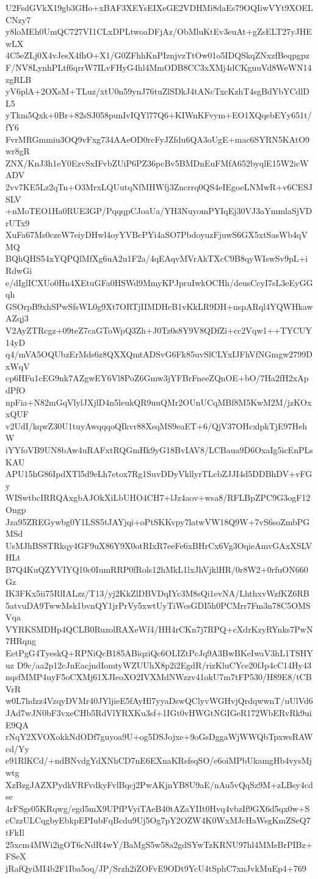 U2FsdGVkX19gb3GHo+xBAF3XEYsEIXeGE2VDHMi8daEs79OQIiwVYt9XOELCNzy7
y8loMEh0UmQC727VI1CLxDPLtwoaDFjAz/ObMluKtEv3euAt+gZsELT27yJHEwLX
4C5eZLj0X4vJesX4fhO+X1/G0ZFhhKnPIznjvzTtOw01o5IDQSkqZNxzfBeqpgpz
F/NV8LynhPLtf6qrrW7ILvFHyG4hl4MmODB8CC3xXMj4dCKguuVd8WeWN14zgRLB
yV6plA+2OXsM+TLuz/xtU0n59ynJ76tuZlSDkJ4tANcTxcKzhT4sgBdYbYCdlDL5
yTkm5Qxk+0Br+82sSJ058punIvIQYl77Q6+KIWnKFvym+EO1XQqebEYy651t/fY6
FvrMRGmmiu3OQ9vFxg734AAeOD0rcFyJZfdu6QA3oUgE+mac6SYRN5KAtO9wr8gR
ZNX/KnJ3h1eY0EzvSxIFvbZUiP6PZ36pcBv5BMDnEuFMfA652byqlE15W2icWADV
2vv7KE5Lz2qTn+O3MrxLQUutqNfMHWfj3Zncrrq0QS4eIEgoeLNMwR+v6CESJSLV
+nMoTEO1Ha0RUE3GP/PqqqpCJoaUa/YH3NuyomPYIqEj30VJ3aYmmlaSjVDrUTx9
XuFa67Ms0czeW7eiyDHwl4oyYVBcPYi4aSO7PbdoyuzFjuwS6GX5xtSasWb4qVMQ
BQhQHS54xYQPQlMfXg6uA2u1F2a/4qEAqvMVrAkTXcC9B8qyWIswSv9pL+iRdwGi
e/dIglICXUo0Hn4XEtuGFa0HSWd9MmyKPJpruIwkOCHh/deusCcyI7sL3eEyGGqh
GSOrpB9xhSPwSfsWL0g9Xt7ORTjIIMDHcB1vKkLR9DH+nspARql4YQWHkawAZqj3
V2AyZTRcgz+09teZ7caGToWpQ3Zh+J0Tz0s8Y9V8QDfZi+cc2Vqw1++TYCUY14yD
q4/mVA5OQUbzErMds6z8QXXQmtADSvG6Fk85uvSlCLYxIJFhVfNGmgw2799DxWqV
cp6HFu1cEG9nk7AZgwEY6Vl8PoZ6Gmw3jYFBrFneeZQnOE+bO/7Ha2fH2xApdPfO
npFia+N82mGqVlylJXjlD4n5leukQR9uuQMr2OUnUCqMBf8M5KwM2M/jzKOxxQUF
v2UdI/kqwZ30U1tuyAwqqqoQIkvr88XsqMS9eaET+6/QjV37OHcxlpkTjE97HehW
iYYfoVB9UN8bAw4uRAFxtRQGmHk9yG18BvIAV8/LCBaua9D6OxaIg5icEnPLsKAU
APU15hG86IpdXTl5d9eLh7etox7Rg1SuvDDyVkllyrTLcbZJJI4d5DDBhDV+vFGy
WISwtbcIRRQAxgbAJOkXiLbUHO4CH7+lJz4aov+wsa8/RFLBpZPC9G3ogF12Ongp
Jza95ZREGywbg0Y1LSS5tJAYjqi+oPtSKKvpy7latwVW18Q9W+7vS6soZmbPGMSd
UsMJhBS8TRkqy4GF9uX86Y9X0otRIxR7eeFe6xBHrCx6Vg3OqieAmvGAxXSLVHLt
B7Q4KuQZYVIYQ10c0IumRRP0fRols12hMkL1lxJhVjklHR/0r8W2+0rfuON660Gz
IK3FKx5ii75RlIALzz/T13/yj2KkZlDBVDqIYc3M8sQi1evNA/LhthxvWzfKZ6RB
5atvuDA9TwwMsk1bvnQY1jrPrVy5xwtUyTiWcsGDI5h0PCMrr7Fm3n78C5OMSVqa
VYRKSMDHp4QCLB0RuzolRAXeWf4/HH4rCKn7j7RPQ+cXdrKzyRYnks7PwN7HRqng
EetPgG4TyeskQ+RPNiQcB185ABiqziQc6OLIZtPcJq9A3BwBKeIwaV3hL1TSHYuz
D9c/aa2p12cJnEacjndIomtyWZUUhX8p2i2EgdR/rizKluCYce20fJp4cC14Hy43
nqsfMMP4uyF5oCXMj61XJIeoXO2IVXMdNWzzv41okU7m7tFP530/H89E8/tCBVrR
w0L7hdzz4VzqyDVMr40JYljieE5fAyHl7yyaDswQClyvWGHvjQrdqwwnT/uUlVd6
JAd7wJN0bF3vxeCHb5RdVlYRXKu3sf+1IGt0vHWGtNGIGeR172WbERvRk9uiE9QA
rNqY2XVOXokkNdODf7guyoa9U+og5DSJojxe+9oGsDggaWjWWQbTpxwsRAWcd/Yy
e91RlKCd/+ndBNvdgYdXNhCD7nE6EXnaKRsfsqSO/e6oiMPbUkamgHb4vysMjwtg
XzBzgJAZXPydkVRFvdkyFvlBqcj2PwAKjnYB8U9aE/nAu5vQqSz9M+zLBsy4cdse
4rFSgs05KRqwg/egd5mX9UPfPVyiTAeB40tAZaYIIt0Hvq4vbzIf9GX6d5qx0w+S
cCzzULCqgbyEbkpEPIubFqBcdu9Uj5Og7pY2OZW4K0WxMJcHaWsgKmZSeQ7tFkIl
25xcm4MWi2igOT6cNdR4wY/BaMgS5w58a2gdSYwTzKRNU97hl4MMsBrPIBz+FSeX
jRafQyiMI4b2F1Iba5oq/JP/Srzh2iZOFvE9ODt9YcU4tSphC7xnJvkMuEp4+769
